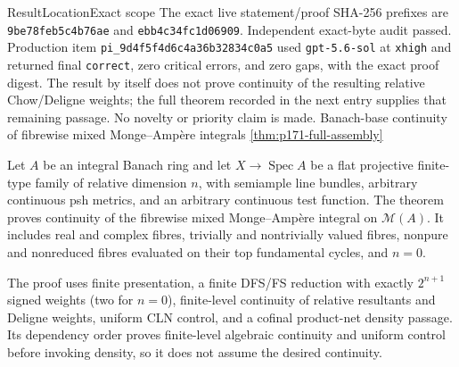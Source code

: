 \begin{AppLProvenanceLedger}{Result}{Location}{Exact scope}
{   The exact live statement/proof SHA-256 prefixes are
   \texttt{9be78feb5c4b76ae} and \texttt{ebb4c34fc1d06909}.
   Independent exact-byte audit passed.  Production item
   \nolinkurl{pi_9d4f5f4d6c4a36b32834c0a5} used
   \texttt{gpt-5.6-sol} at \texttt{xhigh} and returned final
   \texttt{correct}, zero critical errors, and zero gaps, with the exact
   proof digest.  The result by itself does not prove continuity of the
   resulting relative Chow/Deligne weights; the full theorem recorded in the
   next entry supplies that remaining passage.  No novelty or priority claim
   is made.}
\AppLProvenanceRecord
  {Banach-base continuity of fibrewise mixed Monge--Amp\`ere integrals}
  {\cref{thm:p171-full-assembly}}
  {Let \(A\) be an integral Banach ring and let
   \(X\to\operatorname{Spec}A\) be a flat projective finite-type family of
   relative dimension \(n\), with semiample line bundles, arbitrary
   continuous psh metrics, and an arbitrary continuous test function.  The
   theorem proves continuity of the fibrewise mixed Monge--Amp\`ere integral
   on \(\mathcal M(A)\).  It includes real and complex fibres, trivially and
   nontrivially valued fibres, nonpure and nonreduced fibres evaluated on
   their top fundamental cycles, and \(n=0\).

   The proof uses finite presentation, a finite DFS/FS reduction with exactly
   \(2^{n+1}\) signed weights (two for \(n=0\)), finite-level continuity of
   relative resultants and Deligne weights, uniform CLN control, and a
   cofinal product-net density passage.  Its dependency order proves
   finite-level algebraic continuity and uniform control before invoking
   density, so it does not assume the desired continuity.

}
\end{AppLProvenanceLedger}
